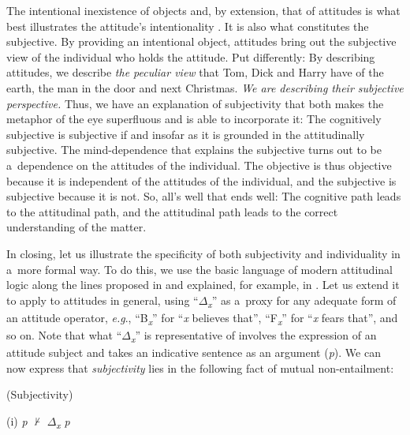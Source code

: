 The intentional inexistence of objects and, by extension, that of attitudes is what best illustrates the attitude's intentionality 
\parencite[cf.][p.xvi]{brentano_introduction_2009}. %
 It is also what constitutes the subjective. By providing an intentional object, attitudes bring out the subjective view of the individual who holds the attitude. Put differently: By describing attitudes, we describe \textit{the peculiar view} that Tom, Dick and Harry have of the earth, the man in the door and next Christmas. \textit{We are describing their subjective perspective.} Thus, we have an explanation of subjectivity that both makes the metaphor of the eye superfluous and is able to incorporate it: The cognitively subjective is subjective if and insofar as it is grounded in the attitudinally subjective. The mind-dependence that explains the subjective turns out to be a~dependence on the attitudes of the individual. The objective is thus objective because it is independent of the attitudes of the individual, and the subjective is subjective because it is not. So, all's well that ends well: The cognitive path leads to the attitudinal path, and the attitudinal path leads to the correct understanding of the matter.



In closing, let us illustrate the specificity of both subjectivity and individuality in a~more formal way. To do this, we use the basic language of modern attitudinal logic along the lines proposed in 
\parencite[][]{hintikka_knowledge_1962} %
 and explained, for example, in 
\parencite[][p.7]{ditmarsch_handbook_2015}. %
 Let us extend it to apply to attitudes in general, using ``$\Delta $\textit{\textsubscript{x}}'' as a~proxy for any adequate form of an attitude operator, \textit{e.g}., ``B\textit{\textsubscript{x}}'' for ``\textit{x} believes that'', ``F\textit{\textsubscript{x}}'' for ``\textit{x} fears that'', and so on. Note that what ``$\Delta $\textit{\textsubscript{x}}'' is representative of involves the expression of an attitude subject and takes an indicative sentence as an argument (\textit{p}). We can now express that \textit{subjectivity} lies in the following fact of mutual non-entailment:



(Subjectivity)



(i) \textit{p} ${\nvdash}$ $\Delta $\textit{\textsubscript{x}} \textit{p}



